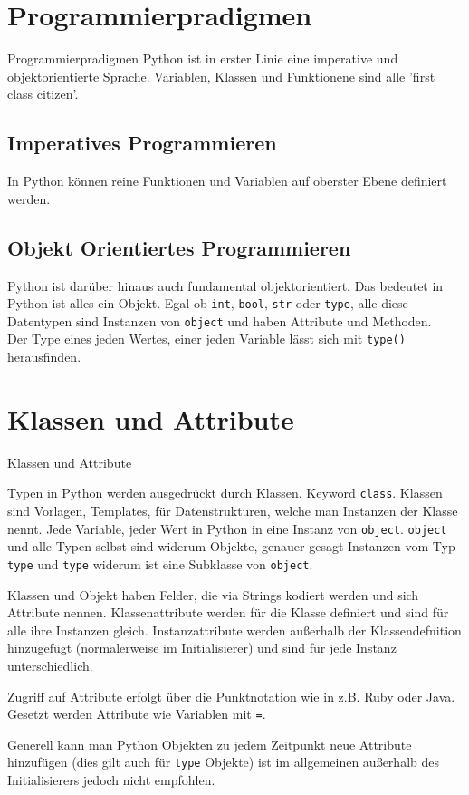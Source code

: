 \section{Programmierpradigmen}
\begin{frame}[fragile]{Programmierpradigmen}
Python ist in erster Linie eine imperative und objektorientierte Sprache. Variablen, Klassen und Funktionene sind alle 'first class citizen'.

\subsection{Imperatives Programmieren}

In Python können reine Funktionen und Variablen auf oberster Ebene definiert werden.

\subsection{Objekt Orientiertes Programmieren}

Python ist darüber hinaus auch fundamental objektorientiert. Das bedeutet in Python ist alles ein Objekt. Egal ob \texttt{int}, \texttt{bool}, \texttt{str} oder \texttt{type}, alle diese Datentypen sind Instanzen von \texttt{object} und haben Attribute und Methoden.\\
Der Type eines jeden Wertes, einer jeden Variable lässt sich mit \texttt{type()} herausfinden.

\end{frame}

\section{Klassen und Attribute}
\begin{frame}[fragile]{Klassen und Attribute}

Typen in Python werden ausgedrückt durch Klassen. Keyword \texttt{class}. Klassen sind Vorlagen, Templates, für Datenstrukturen, welche man Instanzen der Klasse nennt.
Jede Variable, jeder Wert in Python in eine Instanz von \texttt{object}. \texttt{object} und alle Typen selbst sind widerum Objekte, genauer gesagt Instanzen vom Typ \texttt{type} und \texttt{type} widerum ist eine Subklasse von \texttt{object}. 

Klassen und Objekt haben Felder, die via Strings kodiert werden und sich Attribute nennen. Klassenattribute werden für die Klasse definiert und sind für alle ihre Instanzen gleich. Instanzattribute werden außerhalb der Klassendefnition hinzugefügt (normalerweise im Initialisierer) und sind für jede Instanz unterschiedlich.

Zugriff auf Attribute erfolgt über die Punktnotation wie in z.B. Ruby oder Java. Gesetzt werden Attribute wie Variablen mit \texttt{=}.

Generell kann man Python Objekten zu jedem Zeitpunkt neue Attribute hinzufügen (dies gilt auch für \texttt{type} Objekte) ist im allgemeinen außerhalb des Initialisierers jedoch nicht empfohlen.

\end{frame}


